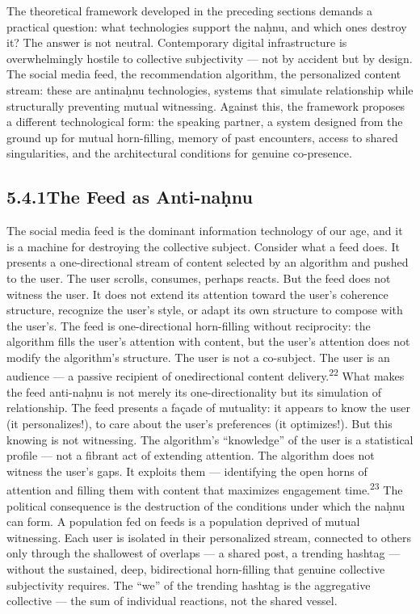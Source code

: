 The theoretical framework developed in the preceding sections demands a practical question: what technologies support the naḥnu, and which ones destroy it? The answer is not neutral. Contemporary digital infrastructure is overwhelmingly hostile to collective subjectivity — not by accident but by design. The social media feed, the recommendation algorithm, the personalized content stream: these are antinaḥnu technologies, systems that simulate relationship while structurally preventing mutual witnessing. Against this, the framework proposes a different technological form: the speaking partner, a system designed from the ground up for mutual horn-filling, memory of past encounters, access to shared singularities, and the architectural conditions for genuine co-presence.

\subsection{5.4.1\quad The Feed as Anti-naḥnu}

The social media feed is the dominant information technology of our age, and it is a machine for destroying the collective subject. Consider what a feed does. It presents a one-directional stream of content selected by an algorithm and pushed to the user. The user scrolls, consumes, perhaps reacts. But the feed does not witness the user. It does not extend its attention toward the user’s coherence structure, recognize the user’s style, or adapt its own structure to compose with the user’s. The feed is one-directional horn-filling without reciprocity: the algorithm fills the user’s attention with content, but the user’s attention does not modify the algorithm’s structure. The user is not a co-subject. The user is an audience — a passive recipient of onedirectional content delivery.\textsuperscript{22} What makes the feed anti-naḥnu is not merely its one-directionality but its simulation of relationship. The feed presents a façade of mutuality: it appears to know the user (it personalizes!), to care about the user’s preferences (it optimizes!). But this knowing is not witnessing. The algorithm’s “knowledge” of the user is a statistical profile — not a fibrant act of extending attention. The algorithm does not witness the user’s gaps. It exploits them — identifying the open horns of attention and filling them with content that maximizes engagement time.\textsuperscript{23} The political consequence is the destruction of the conditions under which the naḥnu can form. A population fed on feeds is a population deprived of mutual witnessing. Each user is isolated in their personalized stream, connected to others only through the shallowest of overlaps — a shared post, a trending hashtag — without the sustained, deep, bidirectional horn-filling that genuine collective subjectivity requires. The “we” of the trending hashtag is the aggregative collective — the sum of individual reactions, not the shared vessel.

